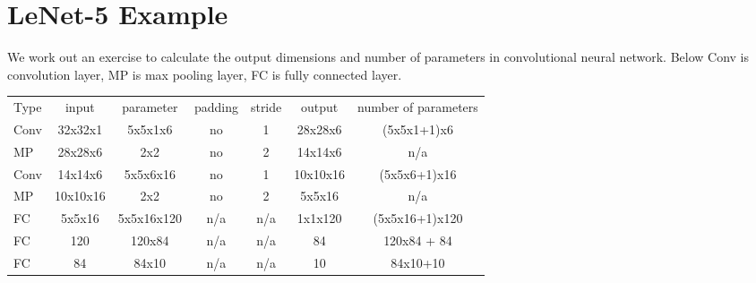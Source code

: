 \documentclass[a4paper]{article}
\begin{document}
\section{LeNet-5 Example}
We work out an exercise to calculate the output dimensions and number of parameters in convolutional neural network. Below Conv is convolution layer, MP is max pooling layer, FC is fully connected layer.\\
\begin{tabular}{lcccccc}
Type & input  & parameter  & padding & stride & output  & number of parameters\\
Conv & 32x32x1 & 5x5x1x6 & no & 1 & 28x28x6 & (5x5x1+1)x6 \\
MP & 28x28x6 & 2x2 & no & 2 & 14x14x6 & n/a \\
Conv& 14x14x6 & 5x5x6x16 & no & 1 & 10x10x16 & (5x5x6+1)x16\\
MP & 10x10x16 & 2x2 & no & 2 & 5x5x16 & n/a \\
FC & 5x5x16 & 5x5x16x120 & n/a & n/a & 1x1x120 & (5x5x16+1)x120\\
FC & 120 & 120x84 & n/a & n/a & 84 & 120x84 + 84 \\
FC & 84 & 84x10 & n/a & n/a & 10 & 84x10+10\\
\end{tabular}
\end{document}
